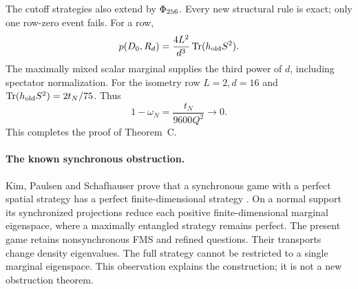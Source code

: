 The cutoff strategies also extend by $\Phi_{256}$. Every new structural rule is exact; only one row-zero event fails. For a row,
\begin{equation}\label{eq:d3}
 p(D_0,R_d)=\frac{4L^2}{d^3}\operatorname{Tr}(h_{\rm old}S^2).
\end{equation}
The maximally mixed scalar marginal supplies the third power of $d$, including spectator normalization. For the isometry row $L=2,d=16$ and $\operatorname{Tr}(h_{\rm old}S^2)=2t_N/75$. Thus
\begin{equation}\label{eq:gamecutoff}
 1-\omega_N=\frac{t_N}{9600Q^2}\longrightarrow0.
\end{equation}
This completes the proof of Theorem~C.

\paragraph{The known synchronous obstruction.}
Kim, Paulsen and Schafhauser prove that a synchronous game with a perfect spatial strategy has a perfect finite-dimensional strategy \cite[Theorem 3.10 and Corollary 3.11]{KPS}. On a normal support its synchronized projections reduce each positive finite-dimensional marginal eigenspace, where a maximally entangled strategy remains perfect. The present game retains nonsynchronous FMS and refined questions. Their transports change density eigenvalues. The full strategy cannot be restricted to a single marginal eigenspace. This observation explains the construction; it is not a new obstruction theorem.
